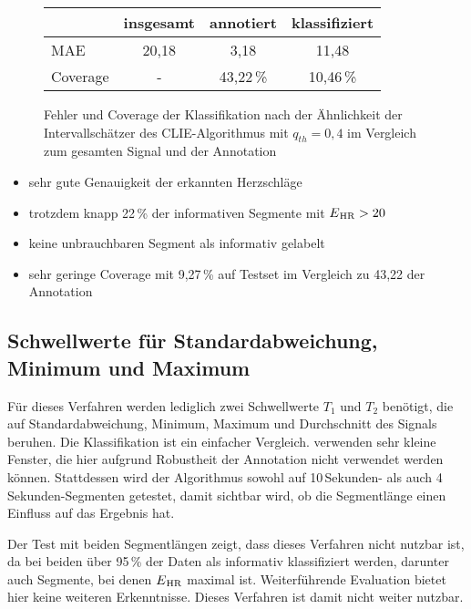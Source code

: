  \begin{figure}
 	\centering
 	\begin{tabular}{l || c | c | c }
 					& insgesamt	& annotiert		& klassifiziert	\\ \hline
 		\ac{MAE} 	& 20{,}18	& 3{,}18			& 11{,}48		\\
 		Coverage	& -			& 43{,}22\,\%	& 10{,}46\,\%	\\
 	\end{tabular}
 	\caption[Fehler und Coverage der Klassifikation nach der Ähnlichkeit der Intervallschätzer des CLIE-Algorithmus mit $q_{th}=0{,}4$ im Vergleich zum gesamten Signal und der Annotation]{Fehler und Coverage der Klassifikation nach der Ähnlichkeit der Intervallschätzer des CLIE-Algorithmus mit $q_{th}=0{,}4$ im Vergleich zum gesamten Signal und der Annotation}
 \end{figure}

\begin{itemize}
	\item sehr gute Genauigkeit der erkannten Herzschläge
	\item trotzdem knapp 22\,\% der informativen Segmente mit $E\textsubscript{HR} > 20$
	\item keine unbrauchbaren Segment als informativ gelabelt
	\item sehr geringe Coverage mit 9{,}27\,\% auf Testset im Vergleich zu 43{,}22 der Annotation
\end{itemize}


\subsection{Schwellwerte für Standardabweichung, Minimum und Maximum}

Für dieses Verfahren werden lediglich zwei Schwellwerte $T_1$ und $T_2$ benötigt, die auf Standardabweichung, Minimum, Maximum und Durchschnitt des Signals beruhen. Die Klassifikation ist ein einfacher Vergleich. \citeauthor{Pino2015} verwenden sehr kleine Fenster, die hier aufgrund Robustheit der Annotation nicht verwendet werden können. Stattdessen wird der Algorithmus sowohl auf 10\,Sekunden- als auch 4\,Sekunden-Segmenten getestet, damit sichtbar wird, ob die Segmentlänge einen Einfluss auf das Ergebnis hat.

Der Test mit beiden Segmentlängen zeigt, dass dieses Verfahren nicht nutzbar ist, da bei beiden über 95\,\% der Daten als informativ klassifiziert werden, darunter auch Segmente, bei denen $E\textsubscript{HR}$ maximal ist. Weiterführende Evaluation bietet hier keine weiteren Erkenntnisse. Dieses Verfahren ist damit nicht weiter nutzbar.

